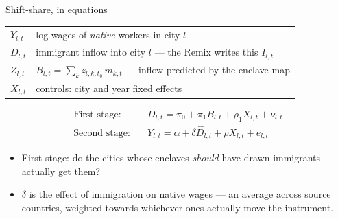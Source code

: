 \documentclass[
  11pt,
  ignorenonframetext,
  aspectratio=169,
]{beamer}
\providecommand{\tightlist}{%
  \setlength{\itemsep}{0pt}\setlength{\parskip}{0pt}}
\begin{document}
\begin{frame}{Shift-share, in equations}
\protect{}\label{shift-share-in-equations}
\begin{center}\small
\begin{tabular}{ll}
\toprule
$Y_{l,t}$ & log wages of \emph{native} workers in city $l$ \\
$D_{l,t}$ & immigrant inflow into city $l$ --- the Remix writes this $I_{l,t}$ \\
$Z_{l,t}$ & $B_{l,t} = \sum_k z_{l,k,t_0}\, m_{k,t}$ --- inflow predicted by the enclave map \\
$X_{l,t}$ & controls: city and year fixed effects \\
\bottomrule
\end{tabular}
\end{center}

\vspace{-0.3em}

\begin{align*}
\text{First stage:}\quad & D_{l,t} = \pi_0 + \pi_1 B_{l,t} + \rho_1 X_{l,t} + \nu_{l,t} \\
\text{Second stage:}\quad & Y_{l,t} = \alpha + \delta \hat D_{l,t} + \rho X_{l,t} + e_{l,t}
\end{align*}

\vspace{-0.3em}

\begin{itemize}
\tightlist
\item
  First stage: do the cities whose enclaves \emph{should} have drawn
  immigrants actually get them?
\item
  \(\delta\) is the effect of immigration on native wages --- an average
  across source countries, weighted towards whichever ones actually move
  the instrument.
\end{itemize}
\end{frame}
\end{document}

